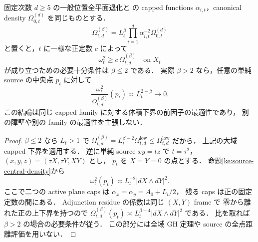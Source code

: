 \begin{corollary}
\label{ke:source-capped-actual-prefactor-sharp}
固定次数 $d\ge5$ の一般位置全平面退化と
\cite[\texttt{coarse:cor:degree-d-volume-lower},
 \texttt{coarse:prop:capped-prefactor-sharp}]{KELocalCurrent}
の capped functions $\alpha_{i,t}$，canonical density
$\Omega_{0,t}^{(d)}$ を同じものとする．
\[
 \Omega_{t,d}^{(\beta)}
 =L_t^\beta\prod_{i=1}^d\alpha_{i,t}^{-2}\Omega_{0,t}^{(d)}
\]
と置くと，$t$ に一様な正定数 $c$ によって
\[
 \omega_t^2\ge c\,\Omega_{t,d}^{(\beta)}
 \quad\text{on }X_t
\]
が成り立つための必要十分条件は $\beta\le2$ である．
実際 $\beta>2$ なら，任意の単純 source の中央点 $p_t$ に対して
\[
 \frac{\omega_t^2}{\Omega_{t,d}^{(\beta)}}(p_t)
 \asymp L_t^{2-\beta}\longrightarrow0.
\]
この結論は同じ capped family に対する体積下界の前因子の最適性であり，
別の障壁や別の family の最適性を主張しない．
\end{corollary}
\begin{proof}
$\beta\le2$ なら $L_t>1$ で
$\Omega_{t,d}^{(\beta)}=L_t^{\beta-2}\Omega_{t,d}^{\mathrm{low}}
\le\Omega_{t,d}^{\mathrm{low}}$ だから，
上記の大域 capped 下界を適用する．
逆に単純 source $xy=tz$ で
$t=\tau^2$，$(x,y,z)=(\tau X,\tau Y,XY)$ とし，
$p_t$ を $X=Y=0$ の点とする．
命題\ref{ke:source-central-density}から
\[
 \omega_t^2(p_t)\asymp L_t^{-2}|dX\wedge dY|^2.
\]
ここで二つの active plane caps は
$\alpha_x=\alpha_y=A_0+L_t/2$，
残る caps は正の固定定数の間にある．
Adjunction residue の係数は同じ $(X,Y)$ frame で
零から離れた正の上下界を持つので
$\Omega_{t,d}^{(\beta)}(p_t)\asymp
L_t^{\beta-4}|dX\wedge dY|^2$ である．
比を取れば $\beta>2$ の場合の必要条件が従う．
この部分には全域 GH 定理や source の全点距離評価を用いない．
\end{proof}

